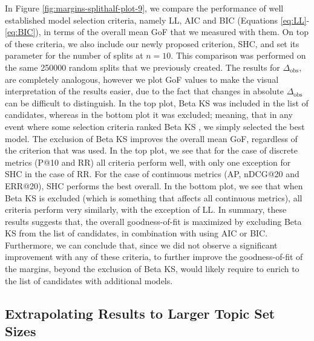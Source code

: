 In Figure \ref{fig:margins-splithalf-plot-9}, we compare the performance of well established model selection criteria, namely LL, AIC and BIC (Equations \ref{eq:LL}-\ref{eq:BIC}), in terms of the overall mean GoF that we measured with them. On top of these criteria, we also include our newly proposed criterion, SHC, and set its parameter for the number of splits at $n=10$. This comparison was performed on the same \num{250000} random splits that we previously created. The results for $\Delta_{\text{obs}}$, are completely analogous, however we plot GoF values to make the visual interpretation of the results easier, due to the fact that changes in absolute $\Delta_{\text{obs}}$ can be difficult to distinguish. In the top plot, Beta KS was included in the list of candidates, whereas in the bottom plot it was excluded; meaning, that in any event where some selection criteria ranked Beta KS , we simply selected the  best model. The exclusion of Beta KS improves the overall mean GoF, regardless of the criterion that was used. In the top plot, we see that for the case of discrete metrics (P@10 and RR) all criteria perform well, with only one exception for SHC in the case of RR. For the case of continuous metrics (AP, nDCG@20 and ERR@20), SHC performs the best overall. In the bottom plot, we see that when Beta KS is excluded (which is something that affects all continuous metrics), all criteria perform very similarly, with the exception of LL. In summary, these results suggests that, the overall goodness-of-fit is maximized by excluding Beta KS from the list of candidates, in combination with using AIC or BIC. Furthermore, we can conclude that, since we did not observe a significant improvement with any of these criteria, to further improve the goodness-of-fit of the margins, beyond the exclusion of Beta KS, would likely require to enrich to the list of candidates with additional models.
 
 

\subsection{Extrapolating Results to Larger Topic Set Sizes}

